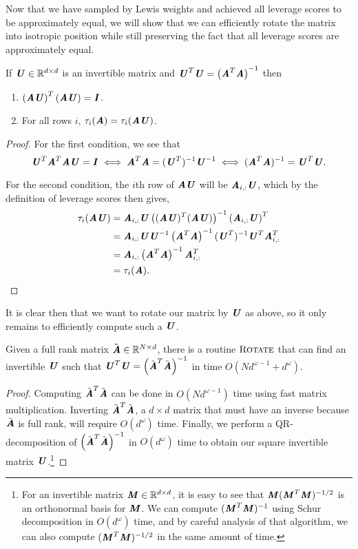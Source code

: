 Now that we have sampled by Lewis weights and achieved all leverage scores to be approximately equal, we will show that we can efficiently rotate the matrix into isotropic position while still preserving the fact that all leverage scores are approximately equal.

\begin{lemma}
	\label{lem:rotate}
	If $\UU \in \R^{d \times d}$ is an invertible matrix and $\UU^T\UU = \left(\AA^T\AA\right)^{-1}$ then
	\begin{enumerate}
		\item $\left(\AA\UU\right)^T\left(\AA\UU\right) = \II$.
		\item For all rows $i$,
		$ \tau_i(\AA) = \tau_i(\AA\UU)$.
	\end{enumerate}
	
\end{lemma}

\begin{proof}
	For the first condition, we see that 
	\[\UU^T\AA^T\AA\UU = \II \iff \AA^T\AA = (\UU^T)^{-1}\UU^{-1} \iff (\AA^T\AA)^{-1} = \UU^T\UU.\]
	
	For the second condition, the $i$th row of $\AA\UU$ will be $\AA_{i,:}\UU$,
	which by the definition of leverage scores then gives,
	\begin{align*}
	\tau_i(\AA\UU) & = \AA_{i,:}\UU\left((\AA\UU)^T(\AA\UU)\right)^{-1}\left(\AA_{i,:}\UU\right)^T \\
	& = \AA_{i,:}\UU \UU^{-1}\left(\AA^T\AA\right)^{-1}(\UU^T)^{-1}\UU^T\AA_{i,:}^T \\
	& = \AA_{i,:}\left(\AA^T \AA\right)^{-1}\AA_{i,:}^T \\
	& = \tau_i(\AA). 
	\end{align*}
\end{proof}

It is clear then that we want to rotate our matrix by $\UU$ as above, so it only remains to efficiently compute such a $\UU$.

\begin{lemma}
	\label{lem:rotateRoutine}
	Given a full rank matrix $\tilde{\AA} \in \R^{N \times d}$,
	there is a routine $\textsc{Rotate}$ that can find an invertible $\UU$
	such that $\UU^T\UU = \left(\tilde{\AA}^T\tilde{\AA}\right)^{-1}$
	in time $O(Nd^{\omega-1} + d^{\omega})$.
\end{lemma}

\begin{proof}
	Computing $\tilde{\AA}^T \tilde{\AA}$ can be done in $O(Nd^{\omega-1})$ time using fast matrix multiplication. Inverting $\tilde{\AA}^T\tilde{\AA}$, a $d \times d$ matrix that must have an inverse because $\tilde{\AA}$ is full rank, will require $O(d^{\omega})$ time.
	Finally, we perform a QR-decomposition of $\left(\tilde{\AA}^T\tilde{\AA}\right)^{-1}$ in $O \left(d^{\omega}\right)$ time to obtain our square invertible matrix $\UU$.\footnote{For an invertible matrix $\MM \in \R^{d \times d}$, it is easy to see that $\MM(\MM^T \MM)^{-1/2}$ is an orthonormal basis for $\MM$. We can compute $(\MM^T \MM)^{-1}$ using Schur decomposition in $O(d^{\omega})$ time, and by careful analysis of that algorithm, we can also compute $(\MM^T \MM)^{-1/2}$ in the same amount of time.}
\end{proof}

